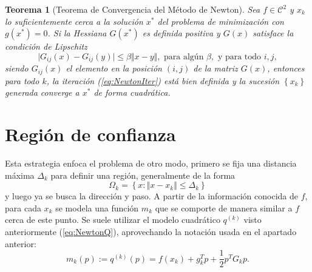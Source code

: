 \documentclass[11pt,a4paper]{book}
\newtheorem{theorem}{Teorema}[chapter]
\theoremstyle{definition}
\theoremstyle{remark}
\begin{document}
\begin{theorem}[Teorema de Convergencia del Método de Newton]
	Sea
	$f \in \mathcal{C}^2$ y $x_k$ lo suficientemente cerca a
	la solución $x^*$ del problema de minimización con
	$g(x^*)=0$. Si la Hessiana $G(x^*)$ es definida positiva y
	$G(x)$ satisface la condición de Lipschitz
	\begin{equation}
		\vert G_{ij}(x) - G_{ij}(y) \vert \leq 
		\beta \Vert x-y \Vert,
		\text{ para algún } \beta,
		\text{ y para todo } i,j,
	\end{equation}
	siendo $G_{ij}(x)$ el elemento en la posición $(i,j)$ de la matriz
	$G(x)$, entonces para todo $k$, la iteración (\ref{eq:NewtonIter})
	está bien definida y la sucesión $\left\{ x_k \right\}$
	generada converge a $x^*$ de forma cuadrática.
\end{theorem}

\section{Región de confianza}\label{sec:tr}

Esta estrategia enfoca el problema de otro modo, primero se fija una distancia máxima $\Delta_k$ para definir una región, generalmente de la forma
\begin{equation}
	\Omega_k = \left\{x : \Vert x-x_k \Vert \leq \Delta_k \right\}
\end{equation}
y luego ya se busca la dirección y paso.
A partir de la información conocida de $f$, para cada $x_k$ se modela una función $m_k$ que se comporte de manera similar a $f$ cerca de este punto.
Se suele utilizar el modelo cuadrático $q^{(k)}$ visto anteriormente (\ref{eq:NewtonQ}), aprovechando la notación usada en el apartado anterior:
\begin{equation}
	m_k(p) := q^{(k)}(p) = f(x_k) + g^T_kp + \frac{1}{2}p^TG_kp.
\end{equation}
\end{document}
